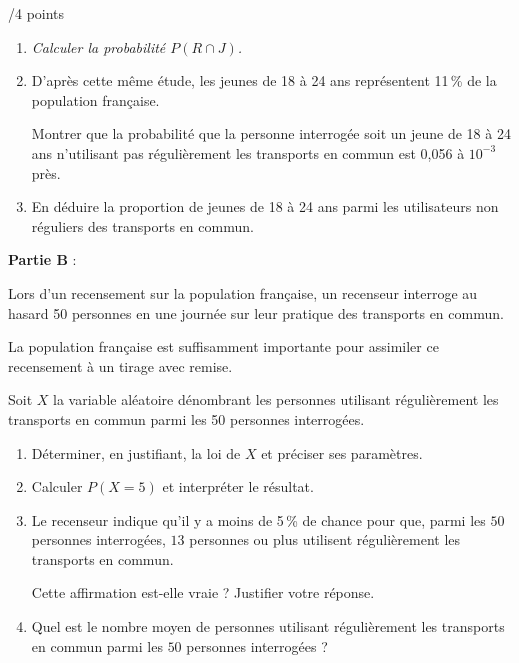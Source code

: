\documentclass[a4paper]{article}
\begin{document}
\begin{exerciceinterro}{\hspace{2cm}/4 points}{}
\begin{enumerate}
\item \textit{Calculer la probabilité $P(R \cap J)$.}
\
\item D'après cette même étude, les jeunes de 18 à 24 ans représentent 11\,\% de la population française.

Montrer que la probabilité que la personne interrogée soit un jeune de 18 à 24 ans n'utilisant pas régulièrement les transports en commun est 0,056 à $10^{-3}$ près.
\item En déduire la proportion de jeunes de 18 à 24 ans parmi les utilisateurs non réguliers des transports en commun.
\end{enumerate}

\bigskip

\textbf{Partie B} :

\medskip

Lors d'un recensement sur la population française, un recenseur interroge au hasard 50 personnes en une journée sur leur pratique des transports en commun. 

La population française est suffisamment importante pour assimiler ce recensement à un tirage avec remise.

Soit $X$ la variable aléatoire dénombrant les personnes utilisant régulièrement les transports en commun parmi les 50 personnes interrogées.

\medskip

\begin{enumerate}
\item Déterminer, en justifiant, la loi de $X$ et préciser ses paramètres.
\item Calculer $P(X = 5)$ et interpréter le résultat.
\item Le recenseur indique qu'il y a moins de 5\,\% de chance pour que, parmi les $50$ personnes interrogées, $13$ personnes ou plus utilisent régulièrement les transports en commun.

Cette affirmation est-elle vraie ? Justifier votre réponse.
\item Quel est le nombre moyen de personnes utilisant régulièrement les transports en commun parmi les $50$ personnes interrogées ?
\end{enumerate}


\end{exerciceinterro}
\end{document}

